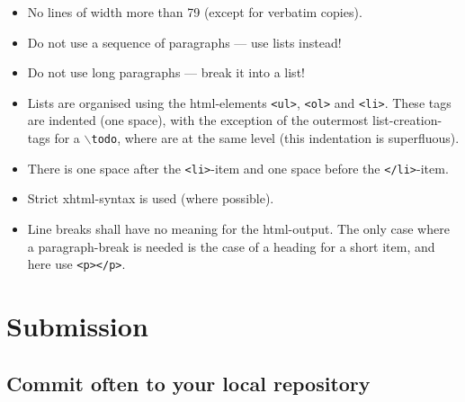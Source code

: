 \documentclass{book}
\begin{document}
\begin{itemize}
\item No lines of width more than 79 (except for verbatim copies).
\item Do not use a sequence of paragraphs --- use lists instead!
\item Do not use long paragraphs --- break it into a list!
\item Lists are organised using the html-elements \texttt{<ul>}, \texttt{<ol>} and \texttt{<li>}. These tags are indented (one space), with the exception of the outermost list-creation-tags for a \texttt{$\backslash$todo}, where are at the same level (this indentation is superfluous).
\item There is one space after the \texttt{<li>}-item and one space before the \texttt{</li>}-item.
\item Strict xhtml-syntax is used (where possible).
\item Line breaks shall have no meaning for the html-output. The only case where a paragraph-break is needed is the case of a heading for a short item, and here use \texttt{<p></p>}.
\end{itemize}
 





\chapter{Submission}
\label{cha:Submission}

\section{Commit often to your local repository}
\label{sec:Submitoften}
\end{document}
